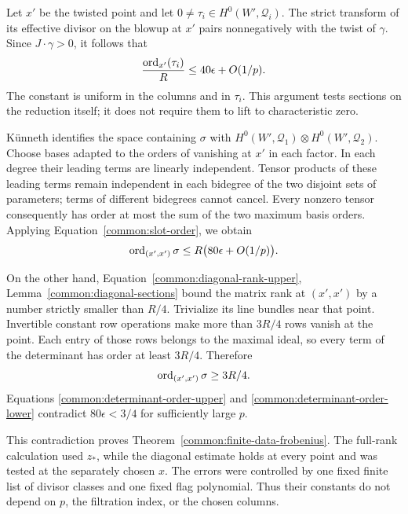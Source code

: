 Let $x'$ be the twisted point and let $0\ne\tau_i\in
H^0(W',\mathcal Q_i)$.  The strict transform of its effective divisor on
the blowup at $x'$ pairs nonnegatively with the twist of $\gamma$.
Since $J\cdot\gamma>0$, it follows that
\begin{equation}\label{common:slot-order}
 \frac{\operatorname{ord}_{x'}(\tau_i)}R\le40\epsilon+O(1/p).
\end{equation}
The constant is uniform in the columns and in $\tau_i$.  This
argument tests sections on the reduction itself; it does not
require them to lift to characteristic zero.

K\"unneth identifies the space containing $\sigma$ with
$H^0(W',\mathcal Q_1)\otimes H^0(W',\mathcal Q_2)$.  Choose bases adapted to the
orders of vanishing at $x'$ in each factor.  In each degree their
leading terms are linearly independent.  Tensor products of these
leading terms remain independent in each bidegree of the two
disjoint sets of parameters; terms of different bidegrees cannot
cancel.  Every nonzero tensor consequently has order at most the
sum of the two maximum basis orders.  Applying
Equation~\eqref{common:slot-order}, we obtain
\begin{equation}\label{common:determinant-order-upper}
 \operatorname{ord}_{(x',x')}\sigma\le R\bigl(80\epsilon+O(1/p)\bigr).
\end{equation}

On the other hand, Equation~\eqref{common:diagonal-rank-upper}, Lemma~\ref{common:diagonal-sections}
bound the matrix rank at $(x',x')$ by a number strictly smaller
than $R/4$.  Trivialize its line bundles near that point.  Invertible
constant row operations make more than $3R/4$ rows vanish at the
point.  Each entry of those rows belongs to the maximal ideal, so
every term of the determinant has order at least $3R/4$.  Therefore
\begin{equation}\label{common:determinant-order-lower}
 \operatorname{ord}_{(x',x')}\sigma\ge3R/4.
\end{equation}
Equations \eqref{common:determinant-order-upper} and
\eqref{common:determinant-order-lower} contradict
$80\epsilon<3/4$ for sufficiently large $p$.


This contradiction proves Theorem~\ref{common:finite-data-frobenius}.
The full-rank calculation used $z_*$, while the diagonal estimate
holds at every point and was tested at the separately chosen $x$.
The errors were controlled by one fixed finite list of divisor
classes and one fixed flag polynomial. Thus their constants do
not depend on $p$, the filtration index, or the chosen columns.

